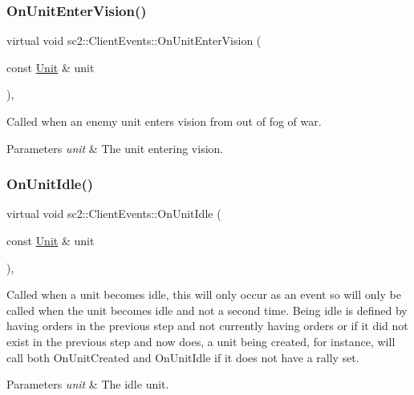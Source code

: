 \subsubsection{\texorpdfstring{On\+Unit\+Enter\+Vision()}{OnUnitEnterVision()}}
{\footnotesize\ttfamily virtual void sc2\+::\+Client\+Events\+::\+On\+Unit\+Enter\+Vision (\begin{DoxyParamCaption}\item[{const \hyperlink{classsc2_1_1_unit}{Unit} \&}]{unit }\end{DoxyParamCaption})\hspace{0.3cm}{\ttfamily [inline]}, {\ttfamily [virtual]}}

Called when an enemy unit enters vision from out of fog of war. 
\begin{DoxyParams}{Parameters}
{\em unit} & The unit entering vision. \\
\hline
\end{DoxyParams}
\mbox{\label{classsc2_1_1_client_events_a5d57eb9cdfa579a7c50442305dbf8635}} 
\subsubsection{\texorpdfstring{On\+Unit\+Idle()}{OnUnitIdle()}}
{\footnotesize\ttfamily virtual void sc2\+::\+Client\+Events\+::\+On\+Unit\+Idle (\begin{DoxyParamCaption}\item[{const \hyperlink{classsc2_1_1_unit}{Unit} \&}]{unit }\end{DoxyParamCaption})\hspace{0.3cm}{\ttfamily [inline]}, {\ttfamily [virtual]}}

Called when a unit becomes idle, this will only occur as an event so will only be called when the unit becomes idle and not a second time. Being idle is defined by having orders in the previous step and not currently having orders or if it did not exist in the previous step and now does, a unit being created, for instance, will call both On\+Unit\+Created and On\+Unit\+Idle if it does not have a rally set. 
\begin{DoxyParams}{Parameters}
{\em unit} & The idle unit. \\
\hline
\end{DoxyParams}
\mbox{\label{classsc2_1_1_client_events_a0ff0017571ba53e018f85dda03861c3a}} 
